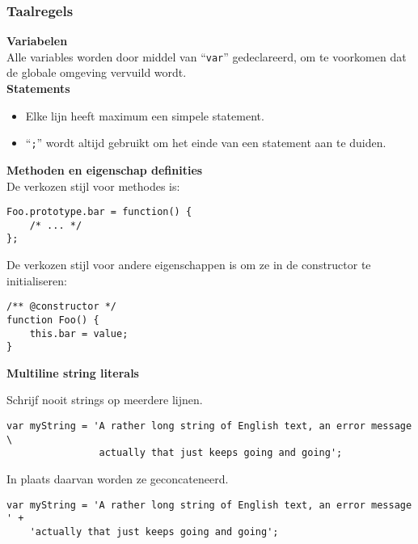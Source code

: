 \subsubsection{Taalregels}

\textbf{Variabelen} \\

Alle variables worden door middel van ``\lstinline{var}'' gedeclareerd, om te voorkomen dat de globale omgeving vervuild wordt. \\

\textbf{Statements} \\

\begin{itemize}
  \item Elke lijn heeft maximum een simpele statement.
  \item ``\lstinline{;}'' wordt altijd gebruikt om het einde van een statement aan te duiden.
\end{itemize}

\textbf{Methoden en eigenschap definities} \\

De verkozen stijl voor methodes is:\\
\begin{lstlisting}
Foo.prototype.bar = function() {
    /* ... */
};
\end{lstlisting}

De verkozen stijl voor andere eigenschappen is om ze in de constructor te initialiseren:\\

\begin{lstlisting}
/** @constructor */
function Foo() {
    this.bar = value;
}
\end{lstlisting}

\textbf{Multiline string literals}

Schrijf nooit strings op meerdere lijnen. \\

\begin{lstlisting}
var myString = 'A rather long string of English text, an error message \
                actually that just keeps going and going';
\end{lstlisting}

In plaats daarvan worden ze geconcateneerd. \\

\begin{lstlisting}
var myString = 'A rather long string of English text, an error message ' +
    'actually that just keeps going and going';
\end{lstlisting}


